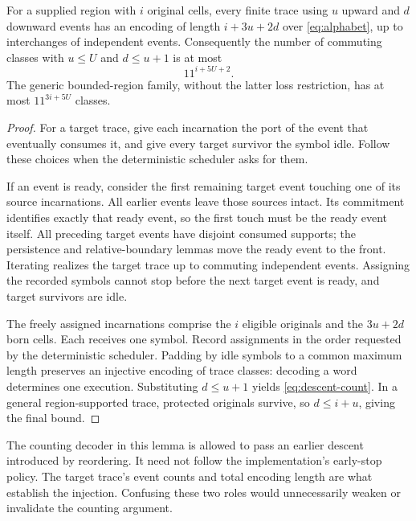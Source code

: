 \begin{lemma}\label{lem:encoding}
For a supplied region with $i$ original cells, every finite trace using
$u$ upward and $d$ downward events has an encoding of length
$i+3u+2d$ over \eqref{eq:alphabet}, up to interchanges of independent events.
Consequently the number of commuting classes with $u\le U$ and
$d\le u+1$ is at most
\begin{equation}\label{eq:descent-count}
 11^{i+5U+2}.
\end{equation}
The generic bounded-region family, without the latter loss restriction,
has at most $11^{3i+5U}$ classes.
\end{lemma}
\begin{proof}
For a target trace, give each incarnation the port of the event that
eventually consumes it, and give every target survivor the symbol idle.
Follow these choices when the deterministic scheduler asks for them.

If an event is ready, consider the first remaining target event touching
one of its source incarnations. All earlier events leave those sources
intact. Its commitment identifies exactly that ready event, so the first
touch must be the ready event itself. All preceding target events have
disjoint consumed supports; the persistence and relative-boundary lemmas
move the ready event to the front. Iterating realizes the target trace
up to commuting independent events. Assigning the recorded symbols cannot
stop before the next target event is ready, and target survivors are idle.

The freely assigned incarnations comprise the $i$ eligible originals and
the $3u+2d$ born cells. Each receives one symbol. Record assignments in the
order requested by the deterministic scheduler. Padding by idle symbols
to a common maximum length preserves an injective encoding of trace
classes: decoding a word determines one execution. Substituting
$d\le u+1$ yields \eqref{eq:descent-count}. In a general region-supported
trace, protected originals survive, so $d\le i+u$, giving the final bound.
\end{proof}

The counting decoder in this lemma is allowed to pass an earlier descent
introduced by reordering. It need not follow the implementation's early-stop
policy. The target trace's event counts and total encoding length are what
establish the injection. Confusing these two roles would unnecessarily weaken
or invalidate the counting argument.

